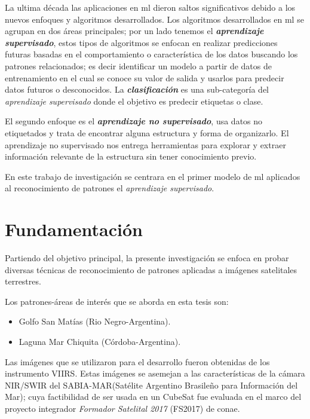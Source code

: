 La ultima década las aplicaciones en \ac{ml} dieron  saltos significativos debido a los nuevos enfoques y algoritmos desarrollados. Los algoritmos desarrollados en \ac{ml} se agrupan  en dos áreas principales; por un lado tenemos  el \textbf{\textit{aprendizaje supervisado}}, estos tipos de algoritmos se enfocan en realizar predicciones futuras basadas en el comportamiento o característica de los datos buscando los patrones relacionados; es decir identificar un modelo a partir de datos de entrenamiento en el cual se conoce su valor de salida y usarlos para predecir datos futuros o desconocidos. La \textbf{\textit{clasificación}} es una sub-categoría del \textit{aprendizaje supervisado} donde el objetivo es predecir etiquetas o clase.

El segundo enfoque es el \textbf{ \textit{aprendizaje no supervisado}}, usa datos no etiquetados y trata de encontrar alguna estructura y forma de organizarlo. El aprendizaje no supervisado nos entrega herramientas para explorar y extraer información relevante de la estructura sin tener conocimiento previo. 

En este trabajo de investigación se centrara en el primer modelo de \ac{ml} aplicados al reconocimiento de patrones el  \textit{aprendizaje supervisado}.




\section{Fundamentación}\label{sec:fundamentacion}
Partiendo del objetivo principal, la presente investigación se enfoca en probar diversas técnicas de reconocimiento de patrones aplicadas a imágenes satelitales terrestres.  

Los patrones-áreas de interés que se aborda en esta tesis son:
\begin{itemize}
	\item Golfo San Matías (Rio Negro-Argentina).
	\item Laguna Mar Chiquita (Córdoba-Argentina).
\end{itemize}

Las imágenes que se utilizaron para el desarrollo fueron obtenidas de los instrumento  VIIRS. Estas imágenes se asemejan a las características de la cámara NIR/SWIR del SABIA-MAR(Satélite Argentino Brasileño para Información del Mar); cuya factibilidad de ser usada en un CubeSat fue evaluada en el marco del proyecto integrador \textit{Formador Satelital 2017} (FS2017) de \ac{conae}.

